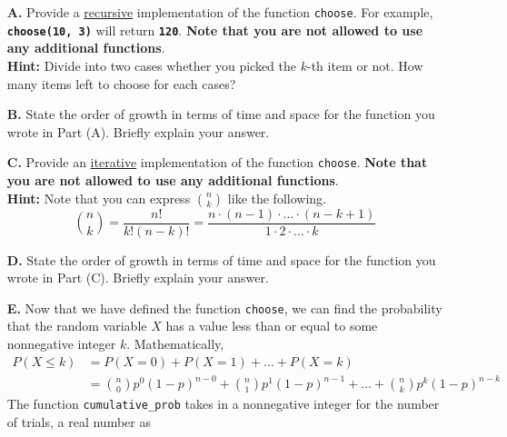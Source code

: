 \begin{enumerate}
\item[\textbf{A.}]
Provide a \underline{recursive} implementation of the function \colorbox{CornflowerBlue!20}{\texttt{choose}}. For example, 
\texttt{\bfseries choose(10, 3)} will return \texttt{\bfseries 120}. \textbf{Note that you are not allowed to use any additional functions}.\\
\textbf{Hint:} Divide into two cases whether you picked the $k$-th item or not. How many items left to choose for each cases?
\begin{flushright}
    [4 marks]
\end{flushright}
\item[\textbf{B.}]
State the order of growth in terms of time and space for the function you wrote in Part (A). Briefly explain your answer.
\begin{flushright}
    [3 marks]
\end{flushright}
\item[\textbf{C.}]
Provide an \underline{iterative} implementation of the function \colorbox{CornflowerBlue!20}{\texttt{choose}}. \textbf{Note that you are not 
allowed to use any additional functions}.\\
\textbf{Hint:} Note that you can express $\binom{n}{k}$ like the following.
\[\binom{n}{k} = \frac{n!}{k!(n-k)!} = \frac{n \cdot (n-1) \cdot \ldots \cdot (n-k+1)}{1 \cdot 2 \cdot \ldots \cdot k}\]
\begin{flushright}
    [4 marks]
\end{flushright}
\item[\textbf{D.}]
State the order of growth in terms of time and space for the function you wrote in Part (C). Briefly explain your answer.
\begin{flushright}
    [2 marks]
\end{flushright}
\item[\textbf{E.}]
Now that we have defined the function \colorbox{CornflowerBlue!20}{\texttt{choose}}, we can find the probability that the random variable $X$ has 
a value less than or equal to some nonnegative integer $k$. Mathematically,
\begin{align*}
    P(X \le k) &= P(X = 0) + P(X = 1) + \ldots + P(X = k) \\
    &= \binom{n}{0}p^0(1-p)^{n-0} + \binom{n}{1}p^1(1-p)^{n-1} + \ldots + \binom{n}{k}p^k(1-p)^{n-k}
\end{align*}
The function \colorbox{CornflowerBlue!20}{\texttt{cumulative\_prob}} takes in a nonnegative integer for the number of trials, a real number as 

\end{enumerate}
